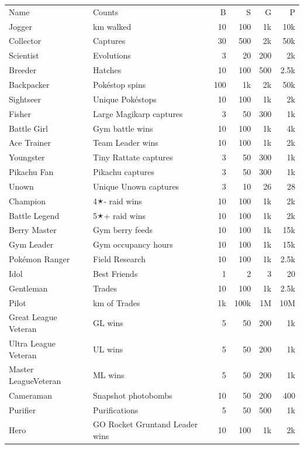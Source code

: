 \begin{longtable}{m{}m{}rrrr}
Name & Counts & B & S & G & P\\
\Midrule\endhead
Jogger & km walked & 10 & 100 & 1k & 10k\\
Collector & Captures & 30 & 500 & 2k & 50k\\
Scientist & Evolutions & 3 & 20 & 200 & 2k\\
Breeder & Hatches & 10 & 100 & 500 & 2.5k\\
Backpacker & Pokéstop spins & 100 & 1k & 2k & 50k\\
Sightseer & Unique Pokéstops & 10 & 100 & 1k & 2k\\
Fisher & Large Magikarp captures & 3 & 50 & 300 & 1k\\
Battle Girl & Gym battle wins & 10 & 100 & 1k & 4k\\
Ace Trainer & Team Leader wins & 10 & 100 & 1k & 2k\\
Youngster & Tiny Rattate captures & 3 & 50 & 300 & 1k\\
Pikachu Fan & Pikachu captures & 3 & 50 & 300 & 1k\\
Unown & Unique Unown captures & 3 & 10 & 26 & 28\\
Champion & 4🟉- raid wins & 10 & 100 & 1k & 2k\\
Battle Legend & 5🟉+ raid wins & 10 & 100 & 1k & 2k\\
Berry Master & Gym berry feeds & 10 & 100 & 1k & 15k\\
Gym Leader & Gym occupancy hours & 10 & 100 & 1k & 15k\\
Pokémon Ranger & Field Research & 10 & 100 & 1k & 2.5k\\
Idol & Best Friends & 1 & 2 & 3 & 20\\
Gentleman & Trades & 10 & 100 & 1k & 2.5k\\
Pilot & km of Trades & 1k & 100k & 1M & 10M\\
Great League Veteran & GL wins & 5 & 50 & 200 & 1k\\
Ultra League Veteran & UL wins & 5 & 50 & 200 & 1k\\
Master League\newline{}Veteran & ML wins & 5 & 50 & 200 & 1k\\
Cameraman & Snapshot photobombs & 10 & 50 & 200 & 400\\
Purifier & Purifications & 5 & 50 & 500 & 1k\\
Hero & GO Rocket Grunt\newline{}and Leader wins & 10 & 100 & 1k & 2k\\

\end{longtable}
